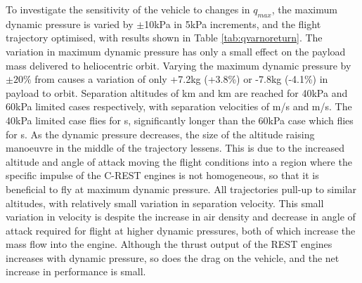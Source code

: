 To investigate the sensitivity of the vehicle to changes in $q_{max}$, the maximum dynamic pressure is varied by $\pm$10kPa in 5kPa increments, and the flight trajectory optimised, with results shown in Table \ref{tab:qvarnoreturn}.
The variation in maximum dynamic pressure has only a small effect on the payload mass delivered to heliocentric orbit.  Varying the maximum dynamic pressure by $\pm20\%$ from causes a variation of only  +7.2kg (+3.8\%) or -7.8kg (-4.1\%) in payload to orbit.  
Separation altitudes of \secondthirdSeparationAltqFortyNoReturn km and \secondthirdSeparationAltqSixtyNoReturn km are reached for 40kPa and 60kPa limited cases respectively, with separation velocities of \secondthirdSeparationvqFortyNoReturn m/s and \secondthirdSeparationvqSixtyNoReturn m/s. The 40kPa limited case flies for \secondFlightTimeqFortyNoReturn s, significantly longer than the 60kPa case which flies for \secondFlightTimeqSixtyNoReturn s.
As the dynamic pressure decreases, the size of the altitude raising manoeuvre in the middle of the trajectory lessens. This is due to the increased altitude and angle of attack moving the flight conditions into a region where the specific impulse of the C-REST engines is not homogeneous, so that it is beneficial to fly at maximum dynamic pressure.  
All trajectories pull-up to similar altitudes, with relatively small variation in separation velocity.
This small variation in velocity is despite the increase in air density and decrease in angle of attack required for flight at higher dynamic pressures, both of which increase the mass flow into the engine. Although the thrust output of the REST engines increases with dynamic pressure, so does the drag on the vehicle, and the net increase in performance is small. 



